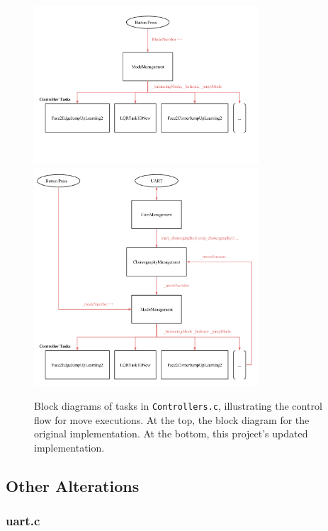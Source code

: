 \begin{figure}[ht]
    \includegraphics[width = 0.75\textwidth]{img/Controllers.png}
    \hrulefill
    \includegraphics[width = 0.75\textwidth]{img/ControllersChoreography.png}
  \caption{Block diagrams of tasks in \texttt{Controllers.c}, illustrating the control flow for move executions. At the top, the block diagram for the original implementation. At the bottom, this project's updated implementation.}
  \label{img:Controllers}
\end{figure}

\subsection{Other Alterations}

\subsubsection{uart.c}

